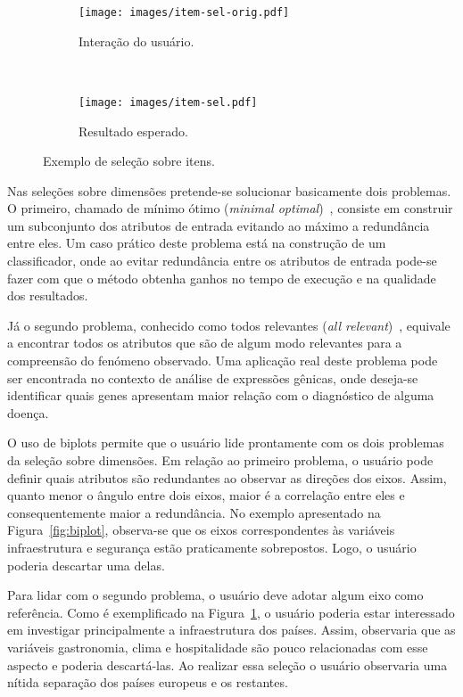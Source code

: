 \begin{figure}[h!]
  \centering
  \begin{subfigure}[b]{0.45\textwidth}
    \centering
    \texttt{[image: images/item-sel-orig.pdf]}
    \caption{Interação do usuário.}
  \end{subfigure}%
  ~
  \begin{subfigure}[b]{0.45\textwidth}
    \centering
    \texttt{[image: images/item-sel.pdf]}
    \caption{Resultado esperado.}
  \end{subfigure} 
  \caption{Exemplo de seleção sobre itens.}
  \label{fig:item-sel}
\end{figure}

Nas seleções sobre dimensões pretende-se solucionar
basicamente dois problemas. O primeiro, chamado de mínimo
ótimo (\emph{minimal optimal})~\cite{Kohavi1997}, consiste
em construir um subconjunto dos atributos de entrada
evitando ao máximo a redundância entre eles. Um caso prático
deste problema está na construção de um classificador, onde
ao evitar redundância entre os atributos de entrada
pode-se fazer com que o método obtenha ganhos no tempo
de execução e na qualidade dos resultados. 

Já o segundo problema, conhecido como todos relevantes
(\emph{all relevant})~\cite{Nilsson2007}, equivale a
encontrar todos os atributos que são de algum modo
relevantes para a compreensão do fenómeno observado. Uma
aplicação real deste problema pode ser encontrada no
contexto de análise de expressões gênicas, onde deseja-se
identificar quais genes apresentam maior relação com o
diagnóstico de alguma doença. 

O uso de biplots permite que o usuário lide prontamente com
os dois problemas da seleção sobre dimensões. Em relação ao
primeiro problema, o usuário pode definir quais atributos
são redundantes ao observar as direções dos eixos. Assim,
quanto menor o ângulo entre dois eixos, maior é a correlação
entre eles e consequentemente maior a redundância. No
exemplo apresentado na Figura~\ref{fig:biplot}, observa-se
que os eixos correspondentes às variáveis infraestrutura e
segurança estão praticamente sobrepostos. Logo, o
usuário poderia descartar uma delas. 

Para lidar com o segundo problema, o usuário deve adotar 
algum eixo como referência. Como é exemplificado na
Figura~\ref{fig:item-sel}, o usuário poderia estar
interessado em investigar principalmente a infraestrutura
dos países. Assim, observaria que as variáveis gastronomia,
clima e hospitalidade são pouco relacionadas com esse
aspecto e poderia descartá-las. Ao realizar essa seleção o
usuário observaria uma nítida separação dos países europeus
e os restantes.

